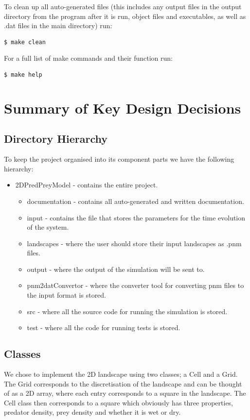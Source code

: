 To clean up all auto-generated files (this includes any output files in the output directory from the program after it is run, object files and executables, as well as .dat files in the main directory) run:
\begin{lstlisting}[language=bash]
$ make clean
\end{lstlisting}


For a full list of make commands and their function run:
\begin{lstlisting}[language=bash]
$ make help
\end{lstlisting}


\section{Summary of Key Design Decisions}
\subsection{Directory Hierarchy}
To keep the project organised into its component parts we have the following hierarchy: 
\begin{itemize}
\item 2DPredPreyModel  - contains the entire project.
\begin{itemize}
\item documentation    - contains all auto-generated and written documentation.
\item input            - contains the file that stores the parameters for the time evolution of the system.
\item landscapes       - where the user should store their input landscapes as .pnm files.
\item output           - where the output of the simulation will be sent to.
\item pnm2datConvertor - where the converter tool for converting pnm files to the input format is stored.
\item src              - where all the source code for running the simulation is stored. 
\item test             - where all the code for running tests is stored. 
\end{itemize}
\end{itemize}
\subsection{Classes}
We chose to implement the 2D landscape using two classes; a Cell and a Grid. The Grid corresponds to the discretisation of the landscape and can be thought of as a 2D array, where each entry corresponds to a square in the landscape. The Cell class then corresponds to a square which obviously has three properties, predator density, prey density and whether it is wet or dry.
